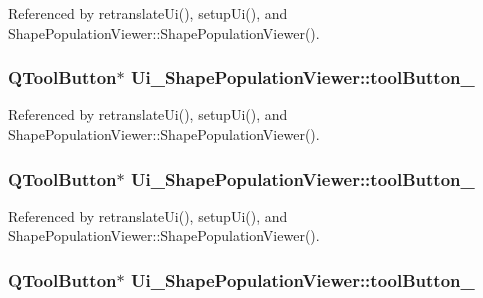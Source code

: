 Referenced by retranslate\-Ui(), setup\-Ui(), and Shape\-Population\-Viewer\-::\-Shape\-Population\-Viewer().

\hypertarget{class_ui___shape_population_viewer_a5259557488aa3aaa990b84b9cdab42f4}{
\subsubsection[{tool\-Button\-\_\-3}]{\setlength{\rightskip}{0pt plus 5cm}Q\-Tool\-Button$\ast$ Ui\-\_\-\-Shape\-Population\-Viewer\-::tool\-Button\-\_}}\label{class_ui___shape_population_viewer_a5259557488aa3aaa990b84b9cdab42f4}


Referenced by retranslate\-Ui(), setup\-Ui(), and Shape\-Population\-Viewer\-::\-Shape\-Population\-Viewer().

\hypertarget{class_ui___shape_population_viewer_aec17295c3295fa64a4c79e60e99b4826}{
\subsubsection[{tool\-Button\-\_\-4}]{\setlength{\rightskip}{0pt plus 5cm}Q\-Tool\-Button$\ast$ Ui\-\_\-\-Shape\-Population\-Viewer\-::tool\-Button\-\_}}\label{class_ui___shape_population_viewer_aec17295c3295fa64a4c79e60e99b4826}


Referenced by retranslate\-Ui(), setup\-Ui(), and Shape\-Population\-Viewer\-::\-Shape\-Population\-Viewer().

\hypertarget{class_ui___shape_population_viewer_a83ca98a5531a253095593571c0714d1d}{
\subsubsection[{tool\-Button\-\_\-5}]{\setlength{\rightskip}{0pt plus 5cm}Q\-Tool\-Button$\ast$ Ui\-\_\-\-Shape\-Population\-Viewer\-::tool\-Button\-\_}}\label{class_ui___shape_population_viewer_a83ca98a5531a253095593571c0714d1d}


